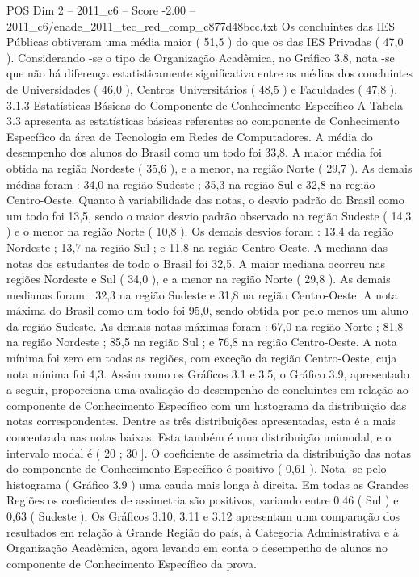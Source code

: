 \begin{textsample}{POS Dim 2 – 2011\_c6 – Score -2.00 – 2011\_c6/enade\_2011\_tec\_red\_comp\_c877d48bcc.txt}
Os concluintes das IES Públicas obtiveram uma média maior ( 51,5 ) do que os das IES Privadas ( 47,0 ).
Considerando -se o tipo de Organização Acadêmica, no Gráfico 3.8, nota -se que não há diferença estatisticamente significativa entre as médias dos concluintes de Universidades ( 46,0 ), Centros Universitários ( 48,5 ) e Faculdades ( 47,8 ). 3.1.3 Estatísticas Básicas do Componente de Conhecimento Específico A Tabela 3.3 apresenta as estatísticas básicas referentes ao componente de Conhecimento Específico da área de Tecnologia em Redes de Computadores.
A média do desempenho dos alunos do Brasil como um todo foi 33,8.
A maior média foi obtida na região Nordeste ( 35,6 ), e a menor, na região Norte ( 29,7 ).
As demais médias foram : 34,0 na região Sudeste ; 35,3 na região Sul e 32,8 na região Centro-Oeste.
Quanto à variabilidade das notas, o desvio padrão do Brasil como um todo foi 13,5, sendo o maior desvio padrão observado na região Sudeste ( 14,3 ) e o menor na região Norte ( 10,8 ).
Os demais desvios foram : 13,4 da região Nordeste ; 13,7 na região Sul ; e 11,8 na região Centro-Oeste.
A mediana das notas dos estudantes de todo o Brasil foi 32,5.
A maior mediana ocorreu nas regiões Nordeste e Sul ( 34,0 ), e a menor na região Norte ( 29,8 ).
As demais medianas foram : 32,3 na região Sudeste e 31,8 na região Centro-Oeste.
A nota máxima do Brasil como um todo foi 95,0, sendo obtida por pelo menos um aluno da região Sudeste.
As demais notas máximas foram : 67,0 na região Norte ; 81,8 na região Nordeste ; 85,5 na região Sul ; e 76,8 na região Centro-Oeste.
A nota mínima foi zero em todas as regiões, com exceção da região Centro-Oeste, cuja nota mínima foi 4,3.
Assim como os Gráficos 3.1 e 3.5, o Gráfico 3.9, apresentado a seguir, proporciona uma avaliação do desempenho de concluintes em relação ao componente de Conhecimento Específico com um histograma da distribuição das notas correspondentes.
Dentre as três distribuições apresentadas, esta é a mais concentrada nas notas baixas.
Esta também é uma distribuição unimodal, e o intervalo modal é ( 20 ; 30 ].
O coeficiente de assimetria da distribuição das notas do componente de Conhecimento Específico é positivo ( 0,61 ).
Nota -se pelo histograma ( Gráfico 3.9 ) uma cauda mais longa à direita.
Em todas as Grandes Regiões os coeficientes de assimetria são positivos, variando entre 0,46 ( Sul ) e 0,63 ( Sudeste ).
Os Gráficos 3.10, 3.11 e 3.12 apresentam uma comparação dos resultados em relação à Grande Região do país, à Categoria Administrativa e à Organização Acadêmica, agora levando em conta o desempenho de alunos no componente de Conhecimento Específico da prova.

\end{textsample}
